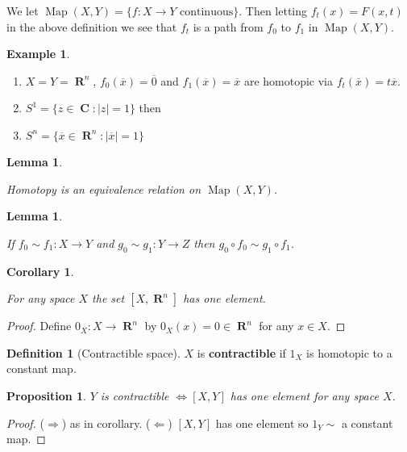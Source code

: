 \documentclass[10pt,]{book}
\newcommand{\terminology}[1]{\textbf{#1}}
\theoremstyle{plain}
\newtheorem{corollary}[theorem]{Corollary}
\newtheorem{lemma}[theorem]{Lemma}
\newtheorem{proposition}[theorem]{Proposition}
\theoremstyle{definition}
\newtheorem{definition}[theorem]{Definition}
\newtheorem{example}[theorem]{Example}
\numberwithin{equation}{section}
\DeclareMathOperator{\Map}{Map}
\DeclareMathOperator{\CC}{\mathbf{C}}
\DeclareMathOperator{\RR}{\mathbf{R}}
\begin{document}
            We let \(\Map(X,Y) = \{f\colon X \to Y \text{ continuous}\}\).
            Then letting \(f_t(x) = F(x,t)\) in the above definition we see that \(f_t\) is a
            path from \(f_0\) to \(f_1\) in \(\Map(X,Y)\).
\begin{example}\label{example-1}
\begin{enumerate}
\item{}\(X = Y = \RR^n\), \(f_0(\overline{x}) = \overline{0}\) and \(f_1(\overline{x}) = \overline{x}\) are homotopic via \(f_t(\overline{x}) = t\overline{x}\).\item{}\(S^1 = \{z\in \CC : |z| = 1\}\) then \item{}\(S^n = \{ \overline{x} \in \RR^n : |\overline{x}| = 1\}\) \end{enumerate}
\end{example}
\begin{lemma}\label{lemma-1}

              Homotopy is an equivalence relation on \(\Map(X,Y)\).
            \end{lemma}
\label{notation-1}
\begin{lemma}\label{lemma-2}

              If \(f_0 \sim f_1\colon X \to Y\) and \(g_0 \sim g_1\colon Y \to Z\) then
              \(g_0\circ f_0 \sim g_1\circ f_1\).
            \end{lemma}
\begin{corollary}\label{corollary-1}

              For any space \(X\) the set \([X,\RR^n]\) has one element.
            \end{corollary}
\begin{proof}

              Define \(0_X\colon X \to \RR^n\) by \(0_X(x) = 0 \in \RR^n\) for any \(x\in X\).
            \end{proof}
\begin{definition}[Contractible space]\label{definition-2}
\(X\) is \terminology{contractible} if \(1_X\) is homotopic to a constant map.
            \end{definition}
\begin{proposition}\label{proposition-1}
\(Y\) is contractible \(\iff\)\([X,Y]\) has one element for any space \(X\).
            \end{proposition}
\begin{proof}

              (\(\Rightarrow\)) as in corollary.  (\(\Leftarrow\)) \([X,Y]\) has one element so
              \(1_Y \sim \) a constant map.
            \end{proof}
\par
\end{document}
